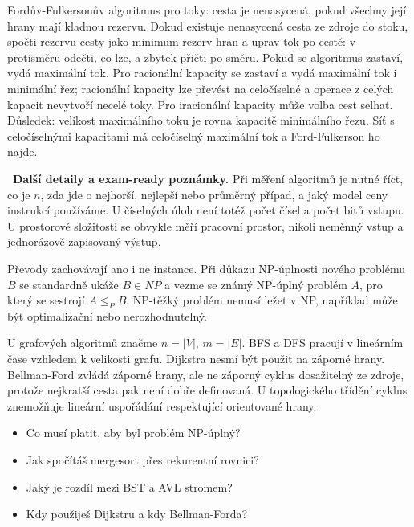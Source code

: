 \begin{odpoved}
Fordův-Fulkersonův algoritmus pro toky: cesta je nenasycená, pokud všechny její hrany
mají kladnou rezervu. Dokud existuje nenasycená cesta ze zdroje do stoku, spočti rezervu
cesty jako minimum rezerv hran a uprav tok po cestě: v protisměru odečti, co lze, a
zbytek přičti po směru. Pokud se algoritmus zastaví, vydá maximální tok. Pro racionální
kapacity se zastaví a vydá maximální tok i minimální řez; racionální kapacity lze
převést na celočíselné a operace z celých kapacit nevytvoří necelé toky. Pro iracionální
kapacity může volba cest selhat. Důsledek: velikost maximálního toku je rovna kapacitě
minimálního řezu. Síť s celočíselnými kapacitami má celočíselný maximální tok a
Ford-Fulkerson ho najde.

\noindent{}\ \textbf{Další detaily a exam-ready poznámky.}
Při měření algoritmů je nutné říct, co je $n$, zda jde o nejhorší, nejlepší nebo
průměrný případ, a jaký model ceny instrukcí používáme. U číselných úloh není totéž
počet čísel a počet bitů vstupu. U prostorové složitosti se obvykle měří pracovní
prostor, nikoli neměnný vstup a jednorázově zapisovaný výstup.

Převody zachovávají ano i ne instance. Při důkazu NP-úplnosti nového problému $B$ se
standardně ukáže $B\in NP$ a vezme se známý NP-úplný problém $A$, pro který se sestrojí
$A\le_P B$. NP-těžký problém nemusí ležet v NP, například může být optimalizační nebo
nerozhodnutelný.

U grafových algoritmů značme $n=|V|$, $m=|E|$. BFS a DFS pracují v lineárním čase
vzhledem k velikosti grafu. Dijkstra nesmí být použit na záporné hrany. Bellman-Ford
zvládá záporné hrany, ale ne záporný cyklus dosažitelný ze zdroje, protože nejkratší
cesta pak není dobře definovaná. U topologického třídění cyklus znemožňuje lineární
uspořádání respektující orientované hrany.
\end{odpoved}

\begin{recall}
\begin{itemize}[leftmargin=1.2em,itemsep=0pt,topsep=1pt]
  \item Co musí platit, aby byl problém NP-úplný?
  \item Jak spočítáš mergesort přes rekurentní rovnici?
  \item Jaký je rozdíl mezi BST a AVL stromem?
  \item Kdy použiješ Dijkstru a kdy Bellman-Forda?
\end{itemize}
\end{recall}

